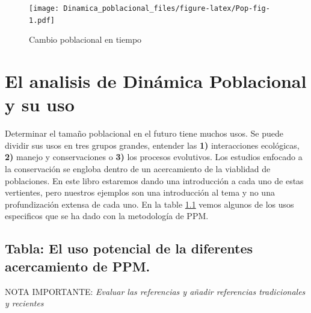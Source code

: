 \documentclass[
]{book}
\theoremstyle{definition}
\theoremstyle{definition}
\theoremstyle{definition}
\theoremstyle{definition}
\theoremstyle{remark}
\begin{document}
\begin{figure}
\centering
\texttt{[image: Dinamica\_poblacional\_files/figure-latex/Pop-fig-1.pdf]}
\caption{\label{fig:Pop-fig}Cambio poblacional en tiempo}
\end{figure}

\hypertarget{el-analisis-de-dinuxe1mica-poblacional-y-su-uso}{%
\section{El analisis de Dinámica Poblacional y su uso}\label{el-analisis-de-dinuxe1mica-poblacional-y-su-uso}}

Determinar el tamaño poblacional en el futuro tiene muchos usos. Se puede dividir sus usos en tres grupos grandes, entender las \textbf{1)} interacciones ecológicas, \textbf{2)} manejo y conservaciones o \textbf{3)} los procesos evolutivos. Los estudios enfocado a la conservación se engloba dentro de un acercamiento de la viablidad de poblaciones. En este libro estaremos dando una introducción a cada uno de estas vertientes, pero nuestros ejemplos son una introducción al tema y no una profundización extensa de cada uno. En la table \ref{USO} vemos algunos de los usos especificos que se ha dado con la metodología de PPM.

\hypertarget{USO}{%
\subsection{Tabla: El uso potencial de la diferentes acercamiento de PPM.}\label{USO}}

NOTA IMPORTANTE: \emph{Evaluar las referencias y añadir referencias tradicionales y recientes}
\end{document}
